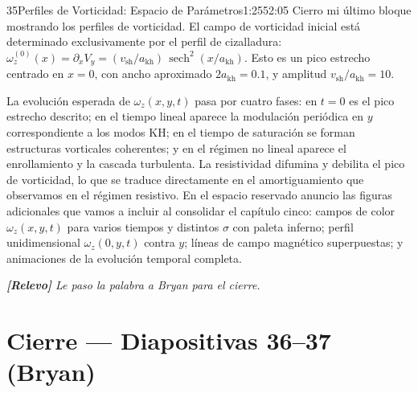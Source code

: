 \documentclass[11pt,a4paper]{article}
\newcommand{\relevo}[1]{%
  \par\medskip
  \noindent\colorbox{tagbg}{\parbox{\dimexpr\linewidth-2\fboxsep\relax}{%
    \small\itshape \textbf{[Relevo]} #1}}\par\medskip}
\begin{document}
\begin{seborador}{35}{Perfiles de Vorticidad: Espacio de Parámetros}{1:25}{52:05}
Cierro mi último bloque mostrando los perfiles de vorticidad. El campo de
vorticidad inicial está determinado exclusivamente por el perfil de
cizalladura: $\omega^{(0)}_z(x)=\partial_x V_y=(v_\text{sh}/a_\text{kh})\,
\operatorname{sech}^2(x/a_\text{kh})$. Esto es un pico estrecho centrado en
$x=0$, con ancho aproximado $2a_\text{kh}=0.1$, y amplitud
$v_\text{sh}/a_\text{kh}=10$.

La evolución esperada de $\omega_z(x,y,t)$ pasa por cuatro fases: en $t=0$ es
el pico estrecho descrito; en el tiempo lineal aparece la modulación
periódica en $y$ correspondiente a los modos KH; en el tiempo de saturación
se forman estructuras vorticales coherentes; y en el régimen no lineal
aparece el enrollamiento y la cascada turbulenta. La resistividad difumina y
debilita el pico de vorticidad, lo que se traduce directamente en el
amortiguamiento que observamos en el régimen resistivo. En el espacio
reservado anuncio las figuras adicionales que vamos a incluir al consolidar
el capítulo cinco: campos de color $\omega_z(x,y,t)$ para varios tiempos y
distintos $\sigma$ con paleta inferno; perfil unidimensional
$\omega_z(0,y,t)$ contra $y$; líneas de campo magnético superpuestas; y
animaciones de la evolución temporal completa.
\relevo{Le paso la palabra a Bryan para el cierre.}
\end{seborador}

\section{Cierre --- Diapositivas 36--37 (Bryan)}
\end{document}
